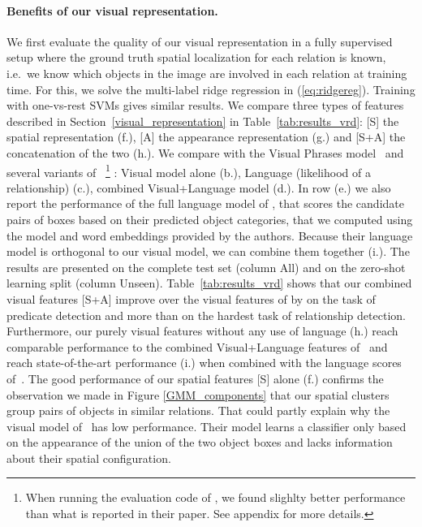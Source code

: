 \documentclass[10pt,twocolumn,letterpaper]{article}
\begin{document}
\paragraph{Benefits of our visual representation.}
We first evaluate the quality of our visual representation in a fully
supervised setup where the ground truth spatial localization for each
relation is known, i.e.\ we know which objects in the image are
involved in each relation at training time. For this, we solve the
multi-label ridge regression in (\ref{eq:ridgereg}). Training with one-vs-rest SVMs gives similar results. We compare three types of features described in Section~\ref{visual_representation} in Table~\ref{tab:results_vrd}:
[S] the spatial representation (f.), [A] the appearance representation (g.) and [S+A]
the concatenation of the two (h.). We compare with the Visual Phrases model~\cite{Sadeghi2011} and several variants of~\cite{Lu16}
\footnote{When running the evaluation code of \cite{Lu16}, we found slighlty better performance than what is reported in their paper. See appendix for more details.}
: Visual model alone (b.), Language (likelihood of a relationship) (c.), combined Visual+Language model (d.). In row (e.) we also report the performance of the full language model of \cite{Lu16}, that scores the candidate pairs of boxes based on their predicted object categories, that we computed using the model and word embeddings provided by the authors.
Because their language model is orthogonal to our visual model, we can combine them together (i.).  
The results are presented on the complete test set (column All) and on the zero-shot learning split (column Unseen).
Table~\ref{tab:results_vrd} shows that our combined visual features [S+A] improve over the visual features of \cite{Lu16} by   on the task of predicate detection and more than  on the hardest task of relationship detection. Furthermore, our purely visual features without any use of language (h.) reach comparable performance to the combined Visual+Language features of~\cite{Lu16} and reach state-of-the-art performance (i.) when combined with the language scores of~\cite{Lu16}. The good performance of our spatial features [S] alone (f.) confirms the observation we made in Figure \ref{GMM_components} that our spatial clusters group pairs of objects in similar relations. That could partly explain why the visual model of~\cite{Lu16} has low performance. Their model learns a classifier only based on the appearance of the union of the two object boxes and lacks information about their spatial configuration.
\end{document}
